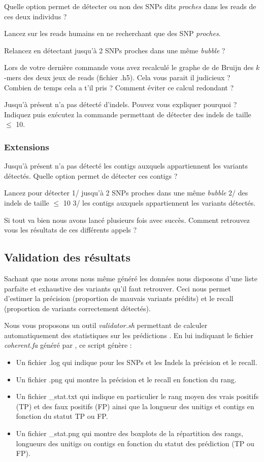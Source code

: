 \qu Quelle option permet  de détecter ou non des SNPs dits \emph{proches} dans les reads de ces deux individus ? 

\qu {} Lancez \discopp sur les reads humains en ne recherchant que des SNP \emph{proches}.

\qu {} Relancez \discopp en détectant jusqu'à 2 SNPs proches dans une même \emph{bubble} ?

\qu Lors de votre dernière commande vous avez recalculé le graphe de de Bruijn des $k$-mers des deux jeux de reads (fichier .h5). Cela vous parait il judicieux ? Combien de temps cela a t'il pris ? Comment éviter ce calcul redondant ? 


\qu {} Jusqu'à présent \discopp n'a pas détecté d'indels. Pouvez vous expliquer pourquoi ? Indiquez puis exécutez la commande permettant de détecter des indels de taille $\leq$ 10.


\subsubsection*{Extensions}
\qu Jusqu'à présent \discopp n'a pas détecté les contigs auxquels appartiennent les variants détectés. Quelle option permet de détecter ces contigs ? 

\qu Lancez \discopp pour détecter 1/ jusqu'à 2 SNPs proches dans une même \emph{bubble} 2/ des indels de taille $\leq$ 10 3/ les contigs auxquels appartiennent les variants détectés.

\qu Si tout va bien nous avons lancé plusieurs fois \discopp avec succès. Comment retrouvez vous les résultats de ces différents appels ? 

\subsection*{Validation des résultats}
Sachant que nous avons nous même généré les données nous disposons d'une liste parfaite et exhaustive des variants qu'il faut retrouver. Ceci nous permet d'estimer la précision (proportion de mauvais variants prédits) et le recall (proportion de variants correctement détectés).

Nous vous proposons un outil \emph{validator.sh} permettant de calculer automatiquement des statistiques sur les prédictions \discopp. En lui indiquant le fichier \emph{coherent.fa} généré par \discopp, ce script génère :
\begin{itemize}
       \item Un fichier .log qui indique pour les SNPs et les Indels la précision et le recall. 
       \item Un fichier .png qui montre la précision et le recall en fonction du rang. 
       \item Un fichier \_stat.txt qui indique en particulier le rang moyen des vrais positifs (TP) et des faux positifs (FP) ainsi que la longueur des unitigs et contigs en fonction du statut TP ou FP.
       \item Un fichier \_stat.png qui montre des boxplots de la répartition des rangs, longueurs des unitigs ou contigs en fonction du statut des prédiction (TP ou FP).
\end{itemize}

